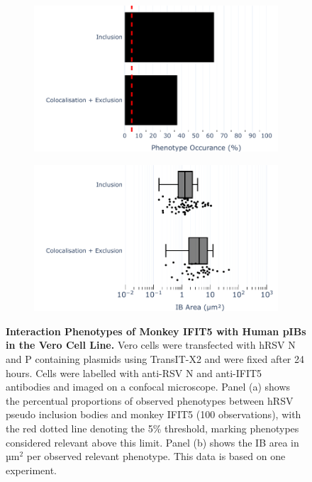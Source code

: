 \begin{figure}
    \begin{subfigure}{0.495\textwidth}
        \caption{}
        \includegraphics[width=1\linewidth]{09. Chapter 4/Figs/01. pIB/05. IFIT5/01. bar_i5_vero.pdf} 
    \end{subfigure}
    \begin{subfigure}{0.495\textwidth}
        \caption{}
        \includegraphics[width=1\linewidth]{09. Chapter 4/Figs/01. pIB/05. IFIT5/02. box_i5_vero.pdf}
    \end{subfigure}
    \caption[Interaction Phenotypes of Monkey IFIT5 with Human pIBs in the Vero Cell Line.]{\textbf{Interaction Phenotypes of Monkey IFIT5 with Human pIBs in the Vero Cell Line.} Vero cells were transfected with hRSV N and P containing plasmids using TransIT-X2 and were fixed after 24 hours. Cells were labelled with anti-RSV N and anti-IFIT5 antibodies and imaged on a confocal microscope. Panel (a) shows the percentual proportions of observed phenotypes between hRSV pseudo inclusion bodies and monkey IFIT5 (100 observations), with the red dotted line denoting the 5\% threshold, marking phenotypes considered relevant above this limit. Panel (b) shows the IB area in \(\mbox{µm}^2\) per observed relevant phenotype. This data is based on one experiment.}
    \label{fig:Interaction Phenotypes of Monkey IFIT5 with Human pIBs in the VERO Cell Line}
\end{figure}

